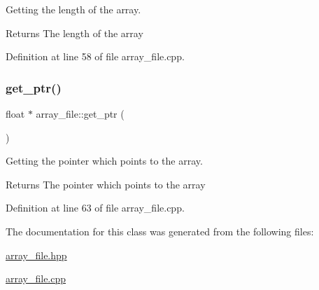 Getting the length of the array. 

\begin{DoxyReturn}{Returns}
The length of the array 
\end{DoxyReturn}


Definition at line 58 of file array\+\_\+file.\+cpp.

\mbox{\label{classarray__file_a5a139068e2410f90766ca94a5ab93f11}} 
\subsubsection{\texorpdfstring{get\+\_\+ptr()}{get\_ptr()}}
{\footnotesize\ttfamily float $\ast$ array\+\_\+file\+::get\+\_\+ptr (\begin{DoxyParamCaption}{ }\end{DoxyParamCaption})}



Getting the pointer which points to the array. 

\begin{DoxyReturn}{Returns}
The pointer which points to the array 
\end{DoxyReturn}


Definition at line 63 of file array\+\_\+file.\+cpp.



The documentation for this class was generated from the following files\+:\begin{DoxyCompactItemize}
\item 
\hyperlink{array__file_8hpp}{array\+\_\+file.\+hpp}\item 
\hyperlink{array__file_8cpp}{array\+\_\+file.\+cpp}\end{DoxyCompactItemize}
